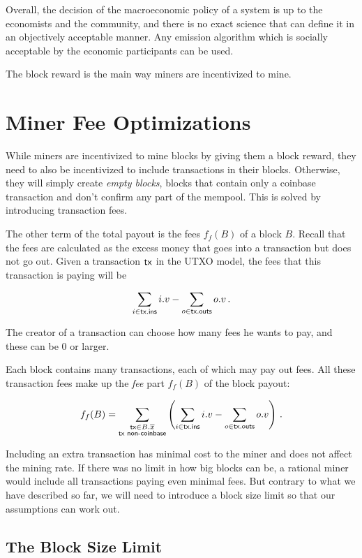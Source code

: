Overall, the decision of the macroeconomic policy of a system is up to
the economists and the community, and there is no exact science that can
define it in an objectively acceptable manner. Any emission algorithm
which is socially acceptable by the economic participants can be used.

The block reward is the main way miners are incentivized to mine.

\section{Miner Fee Optimizations}

While miners are incentivized to mine blocks by giving them a block reward,
they need to also be incentivized to include transactions in their blocks.
Otherwise, they will simply create \emph{empty blocks},
blocks that contain only a coinbase transaction and don't confirm any
part of the mempool. This is solved by introducing transaction fees.

The other term of the total payout is the fees $f_f(B)$ of a block $B$.
Recall that the fees are calculated as the excess money that goes into
a transaction but does not go out. Given a transaction $\mathsf{tx}$ in the UTXO
model, the fees that this transaction is paying will be

\[
   \sum_{i \in \mathsf{tx}\textsf{.ins}} i.v - \sum_{o \in \mathsf{tx}\textsf{.outs}} o.v\,.
\]

The creator of a transaction can choose how many fees he wants to pay,
and these can be $0$ or larger.

Each block contains many transactions, each of which may pay out fees. All
these transaction fees make up the \emph{fee} part $f_f(B)$ of the block payout:

\[
  f_f(B) = \sum_{\substack{\mathsf{tx} \in B.\overline{x}\\\mathsf{tx} \textsf{ non-coinbase}}}
           \left(\sum_{i \in \mathsf{tx}\textsf{.ins}} i.v - \sum_{o \in \mathsf{tx}\textsf{.outs}} o.v\right)\,.
\]

Including an extra transaction has minimal cost to the miner and does not affect the mining
rate. If there was no limit in how big blocks can be, a rational miner would include all
transactions paying even minimal fees. But contrary to what we have described so far,
we will need to introduce a block size limit so that our assumptions can work out.

\subsection*{The Block Size Limit}

